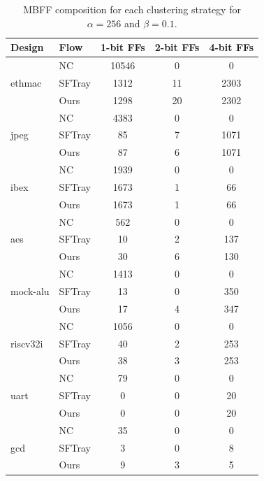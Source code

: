 \begin{table}[t]
\centering
\caption{MBFF composition for each clustering strategy for $\alpha = 256$ and $\beta = 0.1$.}
\label{tab:mbff_alpha_256}
\begin{tabular}{llccc}
\toprule
Design & Flow & 1-bit FFs & 2-bit FFs & 4-bit FFs \\
\midrule
\multirow{3}{*}{ethmac} & NC & 10546 & 0 & 0 \\
 & SFTray & 1312 & 11 & 2303 \\
 & Ours & 1298 & 20 & 2302 \\
\midrule
\multirow{3}{*}{jpeg} & NC & 4383 & 0 & 0 \\
 & SFTray & 85 & 7 & 1071 \\
 & Ours & 87 & 6 & 1071 \\
\midrule
\multirow{3}{*}{ibex} & NC & 1939 & 0 & 0 \\
 & SFTray & 1673 & 1 & 66 \\
 & Ours & 1673 & 1 & 66 \\
\midrule
\multirow{3}{*}{aes} & NC & 562 & 0 & 0 \\
 & SFTray & 10 & 2 & 137 \\
 & Ours & 30 & 6 & 130 \\
\midrule
\multirow{3}{*}{mock-alu} & NC & 1413 & 0 & 0 \\
 & SFTray & 13 & 0 & 350 \\
 & Ours & 17 & 4 & 347 \\
\midrule
\multirow{3}{*}{riscv32i} & NC & 1056 & 0 & 0 \\
 & SFTray & 40 & 2 & 253 \\
 & Ours & 38 & 3 & 253 \\
\midrule
\multirow{3}{*}{uart} & NC & 79 & 0 & 0 \\
 & SFTray & 0 & 0 & 20 \\
 & Ours & 0 & 0 & 20 \\
\midrule
\multirow{3}{*}{gcd} & NC & 35 & 0 & 0 \\
 & SFTray & 3 & 0 & 8 \\
 & Ours & 9 & 3 & 5 \\
\midrule
\bottomrule
\end{tabular}
\end{table}